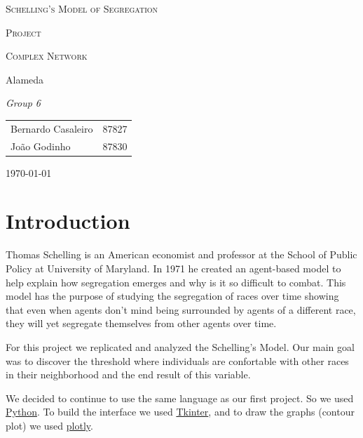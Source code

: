 \documentclass[a4paper,titlepage,11pt]{article}
\begin{document}
\begin{titlepage}
  \begin{center}
    {\scshape \huge Schelling's Model of Segregation \par}
    \vspace{1cm}

    {\scshape \LARGE Project \par}
    \vspace{1.5cm}

    {\scshape \Large Complex Network \par}
    \vspace{0.5cm}

    {\Large Alameda \par}
    \vfill

    {\itshape \Large Group 6 \par}
    \vfill

    \begin{tabular}{l l}
      Bernardo Casaleiro & 87827\\
      João Godinho & 87830\\
    \end{tabular}
    \vfill

    {\large \today\par}
  \end{center}
\end{titlepage}

\section{Introduction}
Thomas Schelling is an American economist and professor at the School of Public Policy at University of Maryland.
In 1971 he created an agent-based model to help explain how segregation emerges and why is it so difficult to combat.
This model has the purpose of studying the segregation of races over time showing that even when agents don't mind
being surrounded by agents of a different race, they will yet segregate themselves from other agents over time.

For this project we replicated and analyzed the Schelling's Model. Our main goal was to discover the threshold
where individuals are confortable with other races in their neighborhood and the end result of this variable.

We decided to continue to use the same language as our first project. So we used \href{https://www.python.org}{Python}.
To build the interface we used \href{https://wiki.python.org/moin/TkInter}{Tkinter},
and to draw the graphs (contour plot) we used \href{https://plot.ly/}{plotly}.
\end{document}
